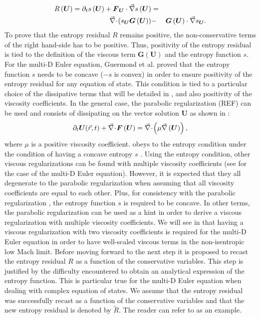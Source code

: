\begin{enumerate}
\begin{eqnarray}
R\left(\boldsymbol{U}\right) = \partial_t s\left(\boldsymbol{U}\right) + \boldsymbol{F}_{\boldsymbol{U}} \cdot \vec{\nabla} s \left(\boldsymbol{U}\right) &=& \nonumber \\
\vec{\nabla}\! \cdot \! ( s_{\boldsymbol{U}} \boldsymbol{G}  \left( \boldsymbol{U} \right) ) &-& \boldsymbol{G}  \left( \boldsymbol{U} \right) \cdot \vec{\nabla} s_{\boldsymbol{U}}.
\end{eqnarray}
%
To prove that the entropy residual $R$ remains positive, the non-conservative terms of the right hand-side has to be positive. Thus, positivity of the entropy residual is tied to the definition of the viscous term $\boldsymbol{G}  \left( \boldsymbol{U} \right)$ and the entropy function $s$. For the multi-D Euler equation, Guermond et al. \cite{jlg} proved that the entropy function $s$ needs to be concave ($-s$ is convex) in order to ensure positivity of the entropy residual for any equation of state. This condition is tied to a particular choice of the dissipative terms that will be detailed in , and also positivity of the viscosity coefficients. In the general case, the parabolic regularization (REF) can be used and consists of dissipating on the vector solution $\boldsymbol{U}$ as shown in : 
%
\begin{equation}\label{eq:hyp_syst4_sct1b}
\partial_t \boldsymbol{U}(\vec{r},t) + \vec{\nabla}\! \cdot \! \boldsymbol{F} \left( \boldsymbol{U} \right) = \vec{\nabla}\! \cdot \! \left( \mu \vec{\nabla} \left( \boldsymbol{U} \right) \right),
\end{equation}
%
where $\mu$ is a positive viscosity coefficient.  obeys to the entropy condition under the condition of having a concave entropy $s$ \cite{Parabolic}. Using the entropy condition, other viscous regularizations can be found with multiple viscosity coefficients (see \cite{jlg} for the case of the multi-D Euler equation). However, it is expected that they all degenerate to the parabolic regularization when assuming that all viscosity coefficients are equal to each other. Plus, for consistency with the parabolic regularization \cite{Parabolic}, the entropy function $s$ is required to be concave. In other terms, the parabolic regularization can be used as a hint in order to derive a viscous regularization with multiple viscosity coefficients. We will see in  that having a viscous regularization with two viscosity coefficients is required for the multi-D Euler equation in order to have well-scaled viscous terms in the non-isentropic low Mach limit. Before moving forward to the next step it is proposed to recast the entropy residual $R$ as a function of the conservative variables. This step is justified by the difficulty encountered to obtain an analytical expression of the entropy function. This is particular true for the multi-D Euler equation when dealing with complex equation of states. We assume that the entropy residual was successfully recast as a function of the conservative variables and that the new entropy residual is denoted by $\tilde{R}$. The reader can refer to  as an example.

\end{enumerate}
